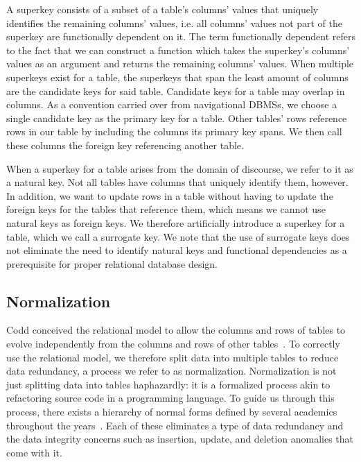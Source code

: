 A superkey consists of a subset of a table's columns' values that uniquely identifies the remaining columns' values, i.e. all columns' values not part of the superkey are functionally dependent on it.
The term functionally dependent refers to the fact that we can construct a function which takes the superkey's columns' values as an argument and returns the remaining columns' values.
When multiple superkeys exist for a table, the superkeys that span the least amount of columns are the candidate keys for said table.
Candidate keys for a table may overlap in columns.
As a convention carried over from navigational DBMSs, we choose a single candidate key as the primary key for a table.
Other tables' rows reference rows in our table by including the columns its primary key spans.
We then call these columns the foreign key referencing another table.

When a superkey for a table arises from the domain of discourse, we refer to it as a natural key.
Not all tables have columns that uniquely identify them, however.
In addition, we want to update rows in a table without having to update the foreign keys for the tables that reference them, which means we cannot use natural keys as foreign keys.
We therefore artificially introduce a superkey for a table, which we call a surrogate key.
We note that the use of surrogate keys does not eliminate the need to identify natural keys and functional dependencies as a prerequisite for proper relational database design.

\subsection{Normalization}%

Codd conceived the relational model to allow the columns and rows of tables to evolve independently from the columns and rows of other tables~\citep{DBLP:journals/cacm/Codd70}.
To correctly use the relational model, we therefore split data into multiple tables to reduce data redundancy, a process we refer to as normalization.
Normalization is not just splitting data into tables haphazardly\thinspace: it is a formalized process akin to refactoring source code in a programming language.
To guide us through this process, there exists a hierarchy of normal forms defined by several academics throughout the years~\citep{DBLP:journals/cacm/Kent83}.
Each of these eliminates a type of data redundancy and the data integrity concerns such as insertion, update, and deletion anomalies that come with it.

